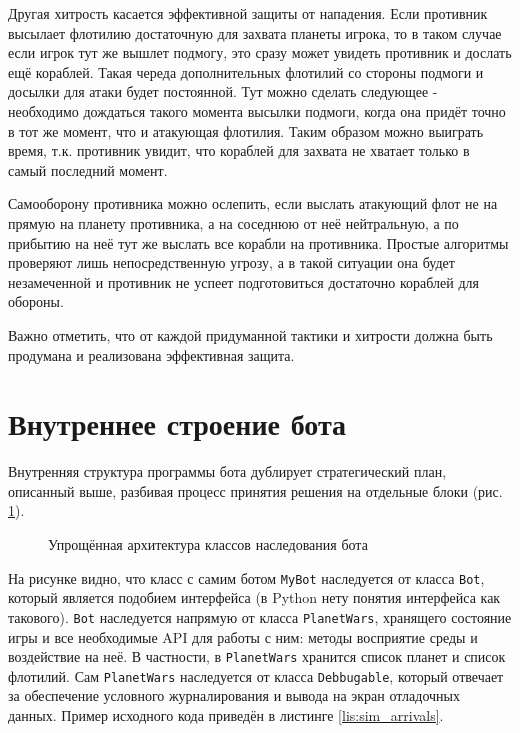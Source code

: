 \documentclass[12pt]{report}
\begin{document}
Другая хитрость касается эффективной защиты от нападения. Если противник высылает флотилию достаточную для захвата планеты игрока, то в таком случае если игрок тут же вышлет подмогу, это сразу может увидеть противник и дослать ещё кораблей. Такая череда дополнительных флотилий со стороны подмоги и досылки для атаки будет постоянной. Тут можно сделать следующее - необходимо дождаться такого момента высылки подмоги, когда она придёт точно в тот же момент, что и атакующая флотилия. Таким образом можно выиграть время, т.к. противник увидит, что кораблей для захвата не хватает только в самый последний момент.

Самооборону противника можно ослепить, если выслать атакующий флот не на прямую на планету противника, а на соседнюю от неё нейтральную, а по прибытию на неё тут же выслать все корабли на противника. Простые алгоритмы проверяют лишь непосредственную угрозу, а в такой ситуации она будет незамеченной и противник не успеет подготовиться достаточно кораблей для обороны.

Важно отметить, что от каждой придуманной тактики и хитрости должна быть продумана и реализована эффективная защита.
\pagebreak
\section{Внутреннее строение бота}
Внутренняя структура программы бота дублирует стратегический план, описанный выше, разбивая процесс принятия решения на отдельные блоки (рис. \ref{fig:bot_arch}).

\begin{figure}[h]
	\centering
	
	\caption{Упрощённая архитектура классов наследования бота}
	\label{fig:bot_arch}
\end{figure}

На рисунке видно, что класс с самим ботом \texttt{MyBot} наследуется от класса \texttt{Bot}, который является подобием интерфейса (в Python нету понятия интерфейса как такового). \texttt{Bot} наследуется напрямую от класса \texttt{PlanetWars}, хранящего состояние игры и все необходимые API для работы с ним: методы восприятие среды и воздействие на неё. В частности, в \texttt{PlanetWars} хранится список планет и список флотилий. Сам \texttt{PlanetWars} наследуется от класса \texttt{Debbugable}, который отвечает за обеспечение условного журналирования и вывода на экран отладочных данных. 
Пример исходного кода приведён в листинге \ref{lis:sim_arrivals}.

\lstset{caption=Метод симулирующий прибытия флотилий,label=lis:sim_arrivals,basicstyle=\footnotesize\ttfamily,captionpos=b,breaklines=true,breakatwhitespace=false,numbers=left,numbersep=5pt,language=Python,frame=single}

\end{document}
